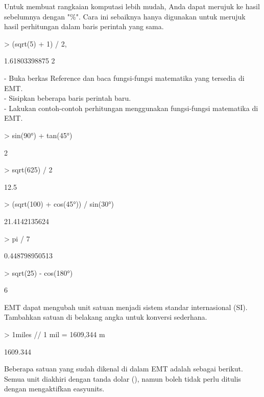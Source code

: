 \documentclass{report}
\begin{document}
\begin{eulernotebook}
\begin{eulercomment}
\begin{eulercomment}
\begin{eulercomment}
Untuk membuat rangkaian komputasi lebih mudah, Anda dapat merujuk ke
hasil sebelumnya dengan "\%". Cara ini sebaiknya hanya digunakan untuk
merujuk hasil perhitungan dalam baris perintah yang sama.
\end{eulercomment}
\begin{eulerprompt}
> (sqrt(5) + 1) / 2, %
\end{eulerprompt}
\begin{euleroutput}
  1.61803398875
  2
\end{euleroutput}
\begin{eulercomment}
- Buka berkas Reference dan baca fungsi-fungsi matematika yang
tersedia di EMT.\\
- Sisipkan beberapa baris perintah baru.\\
- Lakukan contoh-contoh perhitungan menggunakan fungsi-fungsi
matematika di EMT.
\end{eulercomment}
\begin{eulerprompt}
> sin(90°) + tan(45°)
\end{eulerprompt}
\begin{euleroutput}
  2
\end{euleroutput}
\begin{eulerprompt}
> sqrt(625) / 2
\end{eulerprompt}
\begin{euleroutput}
  12.5
\end{euleroutput}
\begin{eulerprompt}
> (sqrt(100) + cos(45°)) / sin(30°)
\end{eulerprompt}
\begin{euleroutput}
  21.4142135624
\end{euleroutput}
\begin{eulerprompt}
> pi / 7
\end{eulerprompt}
\begin{euleroutput}
  0.448798950513
\end{euleroutput}
\begin{eulerprompt}
> sqrt(25) - cos(180°)
\end{eulerprompt}
\begin{euleroutput}
  6
\end{euleroutput}
\begin{eulercomment}
EMT dapat mengubah unit satuan menjadi sistem standar internasional
(SI). Tambahkan satuan di belakang angka untuk konversi sederhana.
\end{eulercomment}
\begin{eulerprompt}
> 1miles // 1 mil = 1609,344 m
\end{eulerprompt}
\begin{euleroutput}
  1609.344
\end{euleroutput}
\begin{eulercomment}
Beberapa satuan yang sudah dikenal di dalam EMT adalah sebagai
berikut. Semua unit diakhiri dengan tanda dolar (\textdollar{}), namun boleh tidak
perlu ditulis dengan mengaktifkan easyunits.


\end{eulercomment}
\end{eulercomment}
\end{eulercomment}
\end{eulernotebook}
\end{document}
